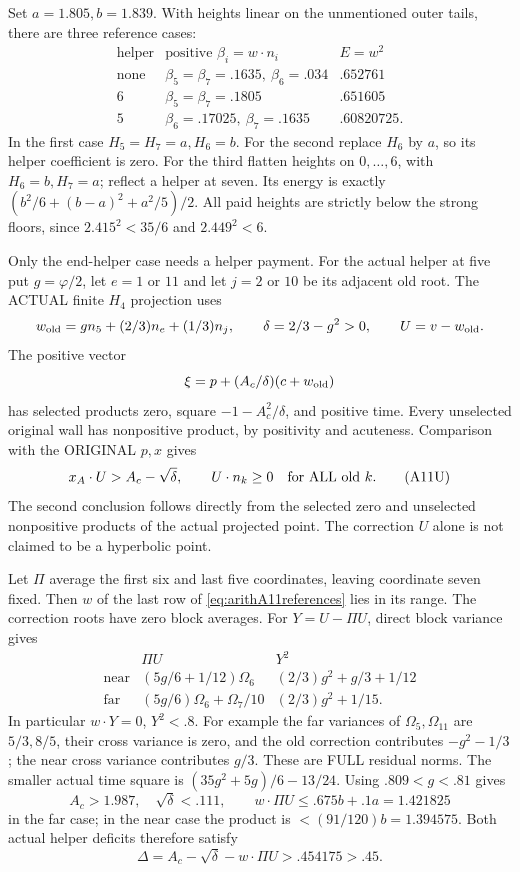 Set \(a=1.805,b=1.839\).
With heights linear on the unmentioned
outer tails, there are three reference cases:
\[
 \begin{array}{c|c|c}
 \text{helper}&\text{positive }\beta_i=w\cdot n_i
                      &E=w^2\\ \hline
 \text{none}&\beta_5=\beta_7=.1635,\ \beta_6=.034&.652761\\
 6&\beta_5=\beta_7=.1805&.651605\\
 5&\beta_6=.17025,\ \beta_7=.1635&.60820725 .
 \end{array}
\tag{A11refs}\label{eq:arithA11references}
\]
In the first case \(H_5=H_7=a,H_6=b\).
For the second replace \(H_6\) by \(a\),
so its helper coefficient is zero.
For the third flatten heights on \(0,\ldots,6\),
with \(H_6=b,H_7=a\); reflect a helper at seven.
Its energy is exactly
\((b^2/6+(b-a)^2+a^2/5)/2\).
All paid heights are strictly below the strong
floors, since \(2.415^2<35/6\) and \(2.449^2<6\).

Only the end-helper case needs a helper payment.
For the actual helper at five put \(g=\varphi/2\),
let \(e=1\) or \(11\) and let \(j=2\) or \(10\)
be its adjacent old root.
The ACTUAL finite \(H_4\) projection uses
\[
 w_{\rm old}=gn_5+(2/3)n_e+(1/3)n_j,\qquad
 \delta=2/3-g^2>0,\qquad U=v-w_{\rm old}.
\]
The positive vector
\[
       \xi=p+(A_c/\delta)(c+w_{\rm old})
\]
has selected products zero, square
\(-1-A_c^2/\delta\), and positive time.
Every unselected original wall has nonpositive
product, by positivity and acuteness.
Comparison with the ORIGINAL \(p,x\) gives
\[
 x_A\cdot U>A_c-\sqrt\delta,\qquad
             U\cdot n_k\ge0\quad\hbox{for ALL old }k .
\tag{A11U}\label{eq:arithA11helperpressure}
\]
The second conclusion follows directly from
the selected zero and unselected nonpositive
products of the actual projected point.
The correction \(U\) alone is not claimed
to be a hyperbolic point.

Let \(\Pi\) average the first six and last five
coordinates, leaving coordinate seven fixed.
Then \(w\) of the last row of
\eqref{eq:arithA11references} lies in its range.
The correction roots have zero block averages.
For \(Y=U-\Pi U\), direct block variance gives
\[
 \begin{array}{c|c|c}
 &\Pi U&Y^2\\ \hline
 \text{near}&(5g/6+1/12)\Omega_6&
           (2/3)g^2+g/3+1/12\\
 \text{far}&(5g/6)\Omega_6+\Omega_7/10&
           (2/3)g^2+1/15 .
 \end{array}
\]
In particular \(w\cdot Y=0\), \(Y^2<.8\).
For example the far variances of
\(\Omega_5,\Omega_{11}\) are \(5/3,8/5\),
their cross variance is zero, and the old
correction contributes \(-g^2-1/3\);
the near cross variance contributes \(g/3\).
These are FULL residual norms.
The smaller actual time square is
\((35g^2+5g)/6-13/24\).
Using \(.809<g<.81\) gives
\[
 A_c>1.987,\quad\sqrt\delta<.111,\qquad
 w\cdot\Pi U\le.675b+.1a=1.421825
\]
in the far case; in the near case the product
is \(<(91/120)b=1.394575\).
Both actual helper deficits therefore satisfy
\[
 \Delta=A_c-\sqrt\delta-w\cdot\Pi U
                         >.454175>.45 .
\]

